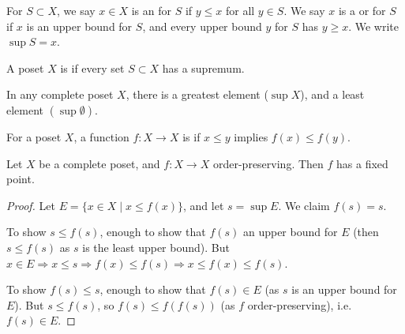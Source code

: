 \documentclass[a4paper, 10pt, twocolumn]{amsart}
\begin{document}

\begin{definition}[Supremum]
  For $S \subset X$, we say $x \in X$ is an  for $S$ if $y \leq x$ for all $y \in S$. We say $x$ is a  or  for $S$ if $x$ is an upper bound for $S$, and every upper bound $y$ for $S$ has $y \geq x$. We write $\sup S = x$.
\end{definition}

\begin{definition}[Complete]
  A poset $X$ is  if every set $S \subset X$ has a supremum.
\end{definition}

In any complete poset $X$, there is a greatest element ($\sup X$), and a least element $(\sup \emptyset)$.

\begin{definition}
  For a poset $X$, a function $f: X \rightarrow X$ is  if $x \leq y$ implies $f(x) \leq f(y)$.
\end{definition}

\begin{theorem}
  Let $X$ be a complete poset, and $f: X \rightarrow X$ order-preserving. Then $f$ has a fixed point.
\end{theorem}
\begin{proof}
  Let $E = \{x \in X \mid x \leq f(x)\}$, and let $s = \sup E$. We claim $f(s) =s$.

  To show $s \leq f(s)$, enough to show that $f(s)$ an upper bound for $E$ (then $s \leq f(s)$ as $s$ is the least upper bound). But $x \in E \Rightarrow x \leq s \Rightarrow f(x) \leq f(s) \Rightarrow x \leq f(x) \leq f(s)$.

To show $f(s) \leq s$, enough to show that $f(s) \in E$ (as $s$ is an upper bound for $E$). But $s \leq f(s)$, so $f(s) \leq f(f(s))$ (as $f$ order-preserving), i.e. $f(s) \in E$.
\end{proof}
\end{document}
